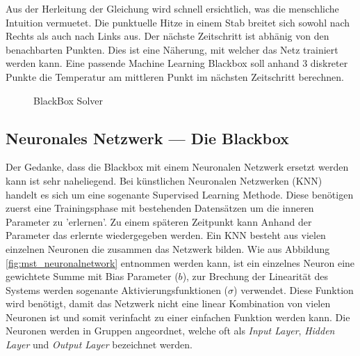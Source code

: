 Aus der Herleitung der Gleichung wird schnell ersichtlich, was die menschliche Intuition vermuetet. Die punktuelle Hitze in einem Stab breitet sich sowohl nach Rechts als auch nach Links aus. Der nächste Zeitschritt ist abhänig von den benachbarten Punkten. Dies ist eine Näherung, mit welcher das Netz trainiert werden kann. Eine passende Machine Learning Blackbox soll anhand 3 diskreter Punkte die Temperatur am mittleren Punkt im nächsten Zeitschritt berechnen.
\begin{figure}[h]
	\centering
	
	\label{fig:mst_blackBoxSolver}
	\caption{BlackBox Solver}
\end{figure}

\subsection{Neuronales Netzwerk --- Die Blackbox}

Der Gedanke, dass die Blackbox mit einem Neuronalen Netzwerk ersetzt werden kann ist sehr naheliegend. Bei künstlichen Neuronalen Netzwerken (KNN) handelt es sich um eine sogenante Supervised Learning Methode. Diese benötigen zuerst eine Trainingsphase mit bestehenden Datensätzen um die inneren Parameter zu 'erlernen'. Zu einem späteren Zeitpunkt kann Anhand der Parameter das erlernte wiedergegeben werden. Ein KNN besteht aus vielen einzelnen Neuronen die zusammen das Netzwerk bilden. Wie aus Abbildung \ref{fig:mst_neuronalnetwork} entnommen werden kann, ist ein einzelnes Neuron eine gewichtete Summe mit Bias Parameter ($b$), zur Brechung der Linearität des Systems werden sogenante Aktivierungsfunktionen ($\sigma$) verwendet. Diese Funktion wird benötigt, damit das Netzwerk nicht eine linear Kombination von vielen Neuronen ist und somit verinfacht zu einer einfachen Funktion werden kann. Die Neuronen werden in Gruppen angeordnet, welche oft als \textit{Input Layer}, \textit{Hidden Layer} und \textit{Output Layer} bezeichnet werden. 

